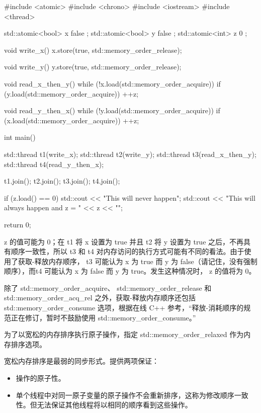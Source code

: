 \begin{cpp}
#include <atomic>
#include <chrono>
#include <iostream>
#include <thread>

std::atomic<bool> x{ false };
std::atomic<bool> y{ false };
std::atomic<int> z{ 0 };

void write_x() {
    x.store(true, std::memory_order_release);
}

void write_y() {
    y.store(true, std::memory_order_release);
}

void read_x_then_y() {
    while (!x.load(std::memory_order_acquire)) {}
    if (y.load(std::memory_order_acquire)) {
        ++z;
    }
}

void read_y_then_x() {
    while (!y.load(std::memory_order_acquire)) {}
    if (x.load(std::memory_order_acquire)) {
        ++z;
    }
}

int main() {
    std::thread t1(write_x);
    std::thread t2(write_y);
    std::thread t3(read_x_then_y);
    std::thread t4(read_y_then_x);

    t1.join();
    t2.join();
    t3.join();
    t4.join();

    if (z.load() == 0) {
        std::cout << "This will never happen\n";
    } {
        std::cout << "This will always happen and z = " << z << "\n";
    }

    return 0;
}
\end{cpp}

z 的值可能为 0；在 t1 将 x 设置为 true 并且 t2 将 y 设置为 true 之后，不再具有顺序一致性，所以 t3 和 t4 对内存访问的执行方式可能有不同的看法。由于使用了获取-释放内存顺序， t3 可能认为 x 为 true 而 y 为 false（请记住，没有强制顺序），而t4 可能认为 x 为 false 而 y 为 true。发生这种情况时， z 的值将为 0。

除了 std::memory\_order\_acquire、 std::memory\_order\_release 和 std::memory\_order\_acq\_rel 之外，获取-释放内存顺序还包括 std::memory\_order\_consume 选项，根据在线 C++ 参考，“释放-消耗顺序的规范正在修订，暂时不鼓励使用 std::memory\_order\_consume。”


为了以宽松的内存排序执行原子操作，指定 std::memory\_order\_relaxed 作为内存排序选项。

宽松内存排序是最弱的同步形式。提供两项保证：

\begin{itemize}
\item
操作的原子性。

\item
单个线程中对同一原子变量的原子操作不会重新排序，这称为修改顺序一致性。但无法保证其他线程将以相同的顺序看到这些操作。
\end{itemize}

